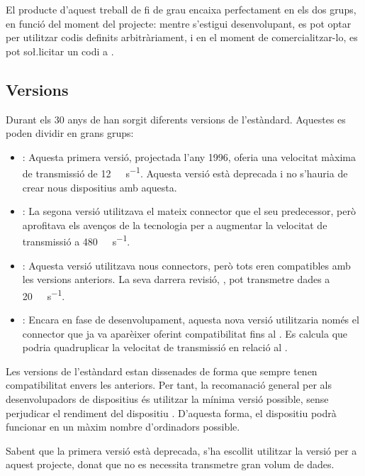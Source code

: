 El producte d'aquest treball de fi de grau encaixa perfectament en els dos
grups, en funció del moment del projecte: mentre s'estigui desenvolupant, es
pot optar per utilitzar codis definits arbitràriament, i en el moment de
comercialitzar-lo, es pot so\l.licitar un codi  a .

\subsection{Versions}
\label{sec:usb_versions}

Durant els 30 anys de  han sorgit diferents versions de
l'estàndard. Aquestes es poden dividir en grans grups:

\begin{itemize}
    \item {}: Aquesta primera versió, projectada l'any 1996, oferia
    una velocitat màxima de transmissió de \SI{12}{\mega\bit\per\second}.
    Aquesta versió està deprecada i no s'hauria de crear nous dispositius amb
    aquesta.
    \item {}: La segona versió utilitzava el mateix connector que el
    seu predecessor, però aprofitava els avenços de la tecnologia per a
    augmentar la velocitat de transmissió a \SI{480}{\mega\bit\per\second}.
    \item {}: Aquesta versió utilitzava nous connectors, però tots
    eren compatibles amb les versions anteriors. La seva darrera revisió,
    , pot transmetre dades a \SI{20}{\giga\bit\per\second}.
    \item {}: Encara en fase de desenvolupament, aquesta nova versió
    utilitzaria només el connector  que ja va aparèixer oferint
    compatibilitat fins al . Es calcula que podria quadruplicar
    la velocitat de transmissió en relació al .
\end{itemize}

Les versions de l'estàndard estan dissenades de forma que sempre tenen
compatibilitat envers les anteriors. Per tant, la recomanació general per als
desenvolupadors de dispositius és utilitzar la mínima versió possible, sense
perjudicar el rendiment del dispositiu  \cite{Axelson2015USB}. D'aquesta forma,
el dispositiu podrà funcionar en un màxim nombre d'ordinadors possible.

Sabent que la primera versió està deprecada, s'ha escollit utilitzar la versió
 per a aquest projecte, donat que no es necessita transmetre gran
volum de dades.

